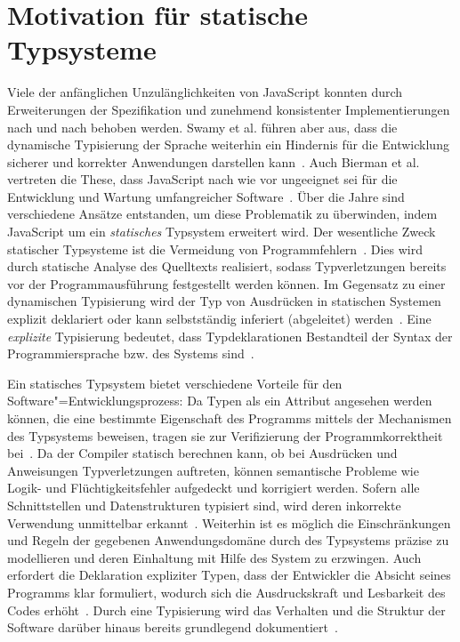 \section{Motivation für statische Typsysteme}

Viele der anfänglichen Unzulänglichkeiten von JavaScript konnten durch Erweiterungen der Spezifikation und zunehmend konsistenter Implementierungen nach und nach behoben werden. Swamy et al. führen aber aus, dass die dynamische Typisierung der Sprache weiterhin ein Hindernis für die Entwicklung sicherer und korrekter Anwendungen darstellen kann~\autocite{NIKHIL:2014}. Auch Bierman et al. vertreten die These, dass JavaScript nach wie vor ungeeignet sei für die Entwicklung und Wartung umfangreicher Software~\autocite[1]{BIERMAN:2014}. Über die Jahre sind verschiedene Ansätze entstanden, um diese Problematik zu überwinden, indem JavaScript um ein \emph{statisches} Typsystem erweitert wird. Der wesentliche Zweck statischer Typsysteme ist die Vermeidung von Programmfehlern~\autocite[1]{CARDELLI:TYPE_SYSTEMS}. Dies wird durch statische Analyse des Quelltexts realisiert, sodass Typverletzungen bereits vor der Programmausführung festgestellt werden können. Im Gegensatz zu einer dynamischen Typisierung wird der Typ von Ausdrücken in statischen Systemen explizit deklariert oder kann selbstständig inferiert (abgeleitet) werden~\autocite[45]{WALDMANN:PPS}. Eine \emph{explizite} Typisierung bedeutet, dass Typdeklarationen Bestandteil der Syntax der Programmiersprache bzw. des Systems sind~\autocite[2]{CARDELLI:TYPE_SYSTEMS}.

Ein statisches Typsystem bietet verschiedene Vorteile für den Software"=Entwicklungsprozess: Da Typen als ein Attribut angesehen werden können, die eine bestimmte Eigenschaft des Programms mittels der Mechanismen des Typsystems beweisen, tragen sie zur Verifizierung der Programmkorrektheit bei~\autocite{SMITH:TYPE_SYSTEMS}. Da der Compiler statisch berechnen kann, ob bei Ausdrücken und Anweisungen Typverletzungen auftreten, können semantische Probleme wie Logik- und Flüchtigkeitsfehler aufgedeckt und korrigiert werden. Sofern alle Schnittstellen und Datenstrukturen typisiert sind, wird deren inkorrekte Verwendung unmittelbar erkannt~\autocite[6]{CARDELLI:TYPE_SYSTEMS}. Weiterhin ist es möglich die Einschränkungen und Regeln der gegebenen Anwendungsdomäne durch des Typsystems präzise zu modellieren und deren Einhaltung mit Hilfe des System zu erzwingen. Auch erfordert die Deklaration expliziter Typen, dass der Entwickler die Absicht seines Programms klar formuliert, wodurch sich die Ausdruckskraft und Lesbarkeit des Codes erhöht~\autocite[96]{WALDMANN:PPS}. Durch eine Typisierung wird das Verhalten und die Struktur der Software darüber hinaus bereits grundlegend dokumentiert~\autocite[Abschn. 6.1.1]{MITCHELL:CONCEPTS}.

